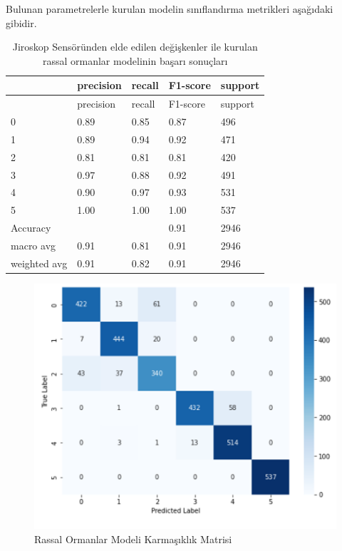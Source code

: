 \documentclass[12pt,twoside]{deuthesis}
\begin{document}
Bulunan parametrelerle kurulan modelin sınıflandırma metrikleri aşağıdaki gibidir.
\begin{longtable}[]{@{}lllll@{}}
\caption{\label{tab:jrf} Jiroskop Sensöründen elde edilen değişkenler ile kurulan rassal ormanlar modelinin başarı sonuçları}\tabularnewline
\toprule()
& precision & recall & F1-score & support \\
\midrule()
\endfirsthead
\toprule()
& precision & recall & F1-score & support \\
\midrule()
\endhead
0 & 0.89 & 0.85 & 0.87 & 496 \\
1 & 0.89 & 0.94 & 0.92 & 471 \\
2 & 0.81 & 0.81 & 0.81 & 420 \\
3 & 0.97 & 0.88 & 0.92 & 491 \\
4 & 0.90 & 0.97 & 0.93 & 531 \\
5 & 1.00 & 1.00 & 1.00 & 537 \\
Accuracy & & & 0.91 & 2946 \\
macro avg & 0.91 & 0.81 & 0.91 & 2946 \\
weighted avg & 0.91 & 0.82 & 0.91 & 2946 \\
\bottomrule()
\end{longtable}
\begin{figure}

{\centering \includegraphics[width=0.9\linewidth,height=0.35\textheight]{figure/random_forest_confmat} 

}

\caption{Rassal Ormanlar Modeli Karmaşıklık Matrisi}\label{fig:randomforestconfmat}
\end{figure}
\end{document}
